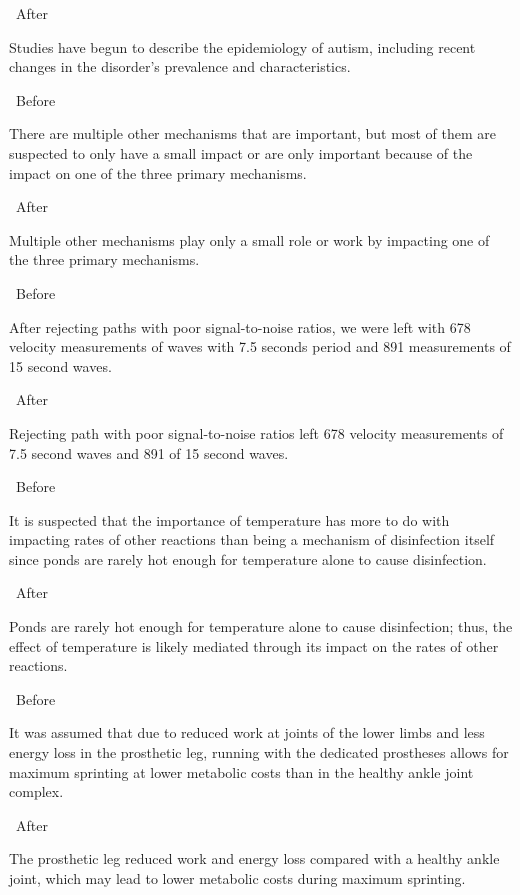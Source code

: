 \documentclass[a4paper, 12pt]{article}
\begin{document}
\par\textbullet\ After
\par Studies have begun to describe the epidemiology of autism, including recent changes in the disorder's prevalence and characteristics.

\par\textbullet\ Before
\par There are multiple other mechanisms that are important, but most of them are suspected to only have a small impact or are only important because of the impact on one of the three primary mechanisms.

\par\textbullet\ After
\par Multiple other mechanisms play only a small role or work by impacting one of the three primary mechanisms.

\par\textbullet\ Before
\par After rejecting paths with poor signal-to-noise ratios, we were left with 678 velocity measurements of waves with 7.5 seconds period and 891 measurements of 15 second waves.

\par\textbullet\ After
\par Rejecting path with poor signal-to-noise ratios left 678 velocity measurements of 7.5 second waves and 891 of 15 second waves.

\par\textbullet\ Before
\par It is suspected that the importance of temperature has more to do with impacting rates of other reactions than being a mechanism of disinfection itself since ponds are rarely hot enough for temperature alone to cause disinfection.

\par\textbullet\ After
\par Ponds are rarely hot enough for temperature alone to cause disinfection; thus, the effect of temperature is likely mediated through its impact on the rates of other reactions.

\par\textbullet\ Before
\par It was assumed that due to reduced work at joints of the lower limbs and less energy loss in the prosthetic leg, running with the dedicated prostheses allows for maximum sprinting at lower metabolic costs than in the healthy ankle joint complex.

\par\textbullet\ After
\par The prosthetic leg reduced work and energy loss compared with a healthy ankle joint, which may lead to lower metabolic costs during maximum sprinting.
\end{document}
